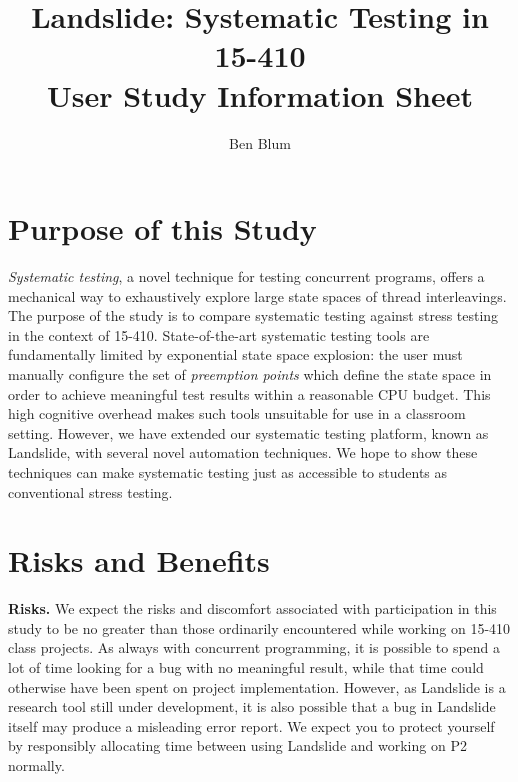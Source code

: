 \documentclass{article}
\begin{document}

\title{\bf Landslide: Systematic Testing in 15-410 \\ User Study Information Sheet}
\author{Ben Blum}
\date{}
\maketitle

\section{Purpose of this Study}

{\em Systematic testing}, a novel technique for testing concurrent programs, offers a mechanical way to exhaustively explore large state spaces of thread interleavings.
The purpose of the study is to compare systematic testing against stress testing in the context of 15-410.
State-of-the-art systematic testing tools are fundamentally limited by exponential state space explosion: the user must manually configure the set of {\em preemption points} which define the state space in order to achieve meaningful test results within a reasonable CPU budget.
This high cognitive overhead makes such tools unsuitable for use in a classroom setting.
However, we have extended our systematic testing platform, known as Landslide, with several novel automation techniques.
We hope to show these techniques can make systematic testing just as accessible to students as conventional stress testing.

\section{Risks and Benefits}

{\bf Risks.}
We expect the risks and discomfort associated with participation in this study to be no greater than those ordinarily encountered while working on 15-410 class projects.
As always with concurrent programming, it is possible to spend a lot of time looking for a bug with no meaningful result, while that time could otherwise have been spent on project implementation.
However, as Landslide is a research tool still under development, it is also possible that a bug in Landslide itself may produce a misleading error report. We expect you to protect yourself by responsibly allocating time between using Landslide and working on P2 normally.
\\
\end{document}
